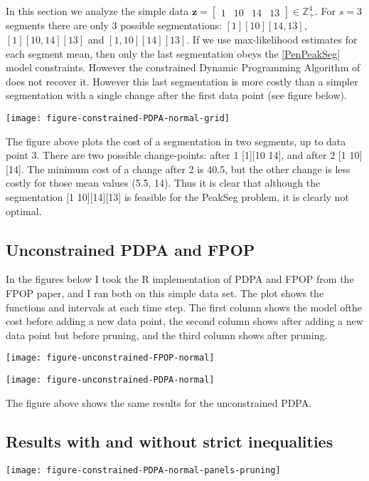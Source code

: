 \documentclass{article}
\newcommand{\ZZ}{\mathbb Z}
\begin{document}
In this section we analyze the simple data
$\mathbf z = \left[\begin{array}{cccc} 1 & 10 & 14 & 13
\end{array}\right]\in\ZZ_+^4
$. For $s=3$ segments there are only 3 possible segmentations:
$[1][10][14, 13]$, $[1][10, 14][13]$ and $[1, 10][14][13]$. If we use
max-likelihood estimates for each segment mean, then only the last
segmentation obeys the \ref{PenPeakSeg} model constraints. However the
constrained Dynamic Programming Algorithm of \citet{PeakSeg} does not
recover it. However this last segmentation is more costly than a
simpler segmentation with a single change after the first data point
(see figure below).

\texttt{[image: figure-constrained-PDPA-normal-grid]}

The figure above plots the cost of a segmentation in two segments, up
to data point 3. There are two possible change-points: after 1 [1][10
14], and after 2 [1 10][14]. The minimum cost of a change after 2 is
40.5, but the other change is less costly for those mean values (5.5,
14). Thus it is clear that although the segmentation [1 10][14][13] is
feasible for the PeakSeg problem, it is clearly not optimal.

\subsection{Unconstrained PDPA and FPOP}

In the figures below I took the R implementation of PDPA and FPOP from
the FPOP paper, and I ran both on this simple data set. The plot shows
the functions and intervals at each time step. The first column shows
the model ofthe cost before adding a new data point, the second column
shows after adding a new data point but before pruning, and the third
column shows after pruning.

\texttt{[image: figure-unconstrained-FPOP-normal]}

\texttt{[image: figure-unconstrained-PDPA-normal]}

The figure above shows the same results for the unconstrained PDPA.

\subsection{Results with and without strict inequalities}

\texttt{[image: figure-constrained-PDPA-normal-panels-pruning]}
\end{document}
